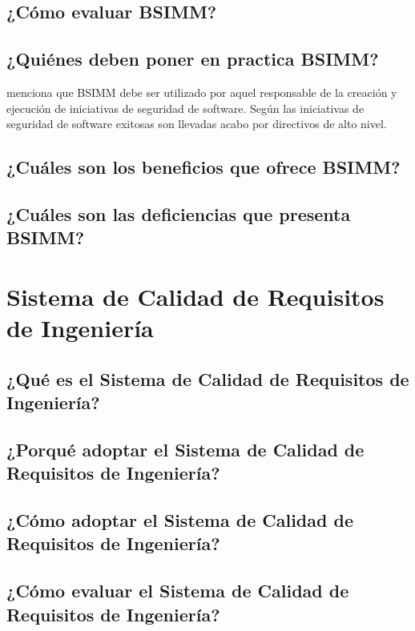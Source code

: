 \documentclass[runningheads,a4paper]{llncs}
\begin{document}
\subsection{¿Cómo evaluar \gls{BSIMM}?}

\subsection{¿Quiénes deben poner en practica \gls{BSIMM}?}
\cite{BSIMM_b} menciona que \gls{BSIMM}  debe ser utilizado por aquel responsable de la creación y ejecución  de iniciativas de seguridad de software. Según \cite{BSIMM_b} las iniciativas de seguridad de software exitosas son llevadas acabo por directivos de alto nivel. 
\subsection{¿Cuáles son los beneficios que ofrece \gls{BSIMM}?}

\subsection{¿Cuáles son las deficiencias que presenta \gls{BSIMM}?}


\section{Sistema de Calidad de Requisitos de Ingeniería}

\subsection{¿Qué es el Sistema de Calidad de Requisitos de Ingeniería?}

\subsection{¿Porqué adoptar el Sistema de Calidad de Requisitos de Ingeniería?}

\subsection{¿Cómo adoptar el Sistema de Calidad de Requisitos de Ingeniería?}

\subsection{¿Cómo evaluar el Sistema de Calidad de Requisitos de Ingeniería?}
\end{document}
